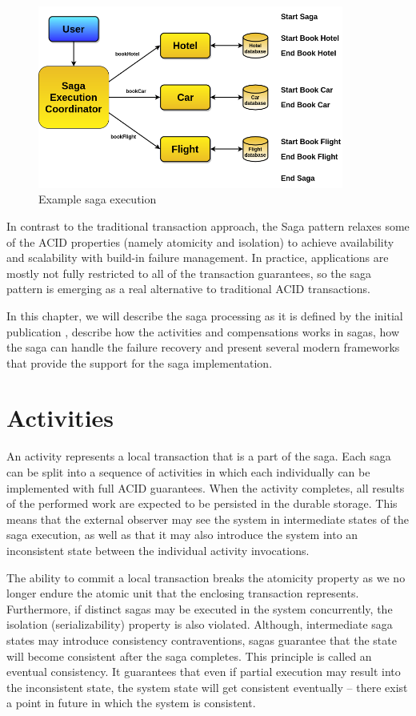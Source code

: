 \documentclass[oneside,
  digital, %
  table,   %
  nolof,     %
  nolot,     %
]{fithesis3}
\begin{document}
\begin{figure}
    \begin{center}
        \includegraphics[height=60mm]{images/tripExample.png}
    \end{center}
    \caption{Example saga execution}
    \label{fig:tripExample}
\end{figure}

In contrast to the traditional transaction approach, the Saga pattern relaxes some of the ACID properties (namely atomicity and isolation) to achieve availability and scalability with build-in failure management. In practice, applications are mostly not fully restricted to all of the transaction guarantees, so the saga pattern is emerging as a real alternative to traditional ACID transactions.

In this chapter, we will describe the saga processing as it is defined by the initial publication \cite{sagas_publ}, describe how the activities and compensations works in sagas, how the saga can handle the failure recovery and present several modern frameworks that provide the support for the saga implementation.

\section{Activities}

An activity represents a local transaction that is a part of the saga. Each saga can be split into a sequence of activities in which each individually can be implemented with full ACID guarantees. When the activity completes, all results of the performed work are expected to be persisted in the durable storage. This means that the external observer may see the system in intermediate states of the saga execution, as well as that it may also introduce the system into an inconsistent state between the individual activity invocations.

The ability to commit a local transaction breaks the atomicity property as we no longer endure the atomic unit that the enclosing transaction represents. Furthermore, if distinct sagas may be executed in the system concurrently, the isolation (serializability) property is also violated. Although, intermediate saga states may introduce consistency contraventions, sagas guarantee that the state will become consistent after the saga completes. This principle is called an eventual consistency. It guarantees that even if partial execution may result into the inconsistent state, the system state will get consistent eventually -- there exist a point in future in which the system is consistent.
\end{document}
